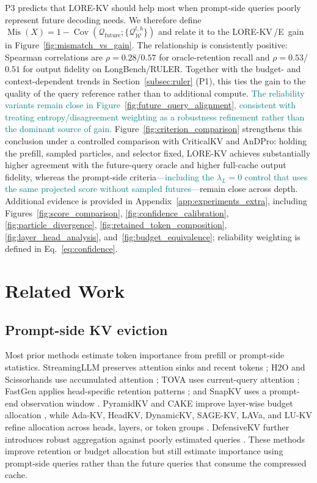 \documentclass{article} %
\newcommand{\lorekvE}{LORE-KV\,/E}
\begin{document}
P3 predicts that LORE-KV should help most when prompt-side queries poorly represent future decoding needs. We therefore define $\operatorname{Mis}(X)=1-\operatorname{Cov}(\mathcal{Q}_{\mathrm{future}};\{\mathcal{Q}^{l,h}_{\mathcal{W}}\})$ and relate it to the \lorekvE\ gain in Figure~\ref{fig:mismatch_vs_gain}. The relationship is consistently positive: Spearman correlations are $\rho=0.28$/$0.57$ for oracle-retention recall and $\rho=0.53$/$0.51$ for output fidelity on LongBench/RULER. Together with the budget- and context-dependent trends in Section~\ref{subsec:ruler} (P1), this ties the gain to the quality of the query reference rather than to additional compute. \textcolor{teal}{The reliability variants remain close in Figure~\ref{fig:future_query_alignment}, consistent with treating entropy/disagreement weighting as a robustness refinement rather than the dominant source of gain.} Figure~\ref{fig:criterion_comparison} strengthens this conclusion under a controlled comparison with CriticalKV and AnDPro: holding the prefill, sampled particles, and selector fixed, LORE-KV achieves substantially higher agreement with the future-query oracle and higher full-cache output fidelity, whereas the prompt-side criteria\textcolor{teal}{---including the $\lambda_L{=}0$ control that uses the same projected score without sampled futures---}remain close across depth. Additional evidence is provided in Appendix~\ref{app:experiments_extra}, including Figures~\ref{fig:score_comparison}, \ref{fig:confidence_calibration}, \ref{fig:particle_divergence}, \ref{fig:retained_token_composition}, \ref{fig:layer_head_analysis}, and~\ref{fig:budget_equivalence}; reliability weighting is defined in Eq.~\ref{eq:confidence}.


\section{Related Work}
\label{sec:related_work}
\subsection{Prompt-side KV eviction} \label{subsec:rw_eviction}
Most prior methods estimate token importance from prefill or prompt-side statistics. StreamingLLM preserves attention sinks and recent tokens \citep{xiao2023streamingllm}; H2O and Scissorhands use accumulated attention \citep{zhang2023h2o,liu2023scissorhands}; TOVA uses current-query attention \citep{oren2024transformers}; FastGen applies head-specific retention patterns \citep{ge2024fastgen}; and SnapKV uses a prompt-end observation window \citep{li2024snapkv}. PyramidKV and CAKE improve layer-wise budget allocation \citep{cai2024pyramidkv,qin2025cake}, while Ada-KV, HeadKV, DynamicKV, SAGE-KV, LAVa, and LU-KV refine allocation across heads, layers, or token groups \citep{feng2024adakv,fu2024headkv,zhou2024dynamickv,wang2025sagekv,shen2025lava,tang2026lukv}. DefensiveKV further introduces robust aggregation against poorly estimated queries \citep{feng2025taming}. These methods improve retention or budget allocation but still estimate importance using prompt-side queries rather than the future queries that consume the compressed cache.
\end{document}
